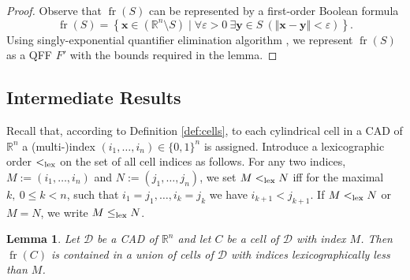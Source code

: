 \documentclass[
]{book}
\newtheorem{lemma}{Lemma}[chapter]
\theoremstyle{definition}
\theoremstyle{definition}
\theoremstyle{definition}
\theoremstyle{definition}
\theoremstyle{remark}
\begin{document}
\begin{proof}
Observe that \({\operatorname{fr} \left( S \right)}\) can be represented by a first-order Boolean formula
\begin{equation}
\label{eq:frontier-first-order}
{\operatorname{fr} \left( S \right)} = \left\{ \mathbf{x} \in (\mathbb{R}^n \setminus S) \mid \forall \varepsilon >0\> \exists \mathbf{y} \in S\> (\Vert \mathbf{x} - \mathbf{y} \Vert < \varepsilon ) \right\}.
\end{equation}
Using singly-exponential quantifier elimination algorithm \citep[Algorithm 14.21]{bpr2006}, we represent \({\operatorname{fr} \left( S \right)}\)
as a QFF \(F'\) with the bounds required in the lemma.
\end{proof}

\hypertarget{intermediate-results}{%
\subsection{Intermediate Results}\label{intermediate-results}}

Recall that, according to Definition \ref{def:cells}, to each cylindrical cell in a CAD of \(\mathbb{R}^n\) a (multi-)index
\((i_1, \ldots ,i_n) \in \{ 0,1 \}^n\) is assigned.
Introduce a lexicographic order \(<_{\rm{lex}}\) on the set of all cell indices as follows.
For any two indices, \(M:=(i_1,\ldots,i_n)\) and \(N:=(j_1,\ldots,j_n)\), we set \(M <_{\rm{lex}}N\)
iff for the maximal \(k,\ 0 \le k <n\), such that \(i_1=j_1, \ldots, i_k=j_k\) we have \(i_{k+1} < j_{k+1}\).
If \(M <_{\rm{lex}}N\) or \(M = N\), we write \(M \le_{\rm{lex}}N\).

\begin{lemma}
\protect\hypertarget{lem:fr-lex-less}{}\label{lem:fr-lex-less}Let \(\mathcal{D}\) be a CAD of \(\mathbb{R}^n\) and let \(C\) be a cell of \(\mathcal{D}\) with index \(M\).
Then \({\operatorname{fr} \left( C \right)}\) is contained in a union of cells of \(\mathcal{D}\) with indices lexicographically less than \(M\).
\end{lemma}
\end{document}
